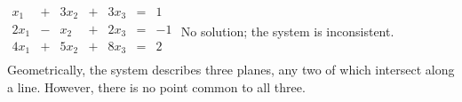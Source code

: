 {$\begin{array}{ccccccc}
x_1&+&3x_2&+&3x_3&=&1\\
2x_1&-&x_2&+&2x_3&=&-1\\
4x_1&+&5x_2&+&8x_3&=&2\\
\end{array}$}
{No solution; the system is inconsistent. Geometrically, the system describes three planes, any two of which intersect along a line. However, there is no point common to all three.}
